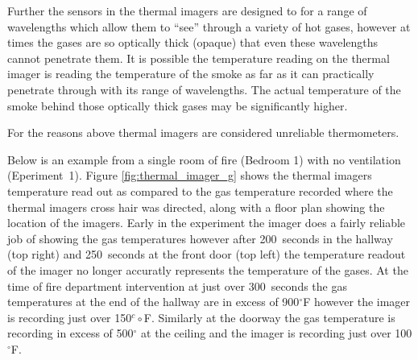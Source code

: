 \documentclass[12pt,oneside]{book}
\begin{document}
Further the sensors in the thermal imagers are designed to for a range of wavelengths which allow them to ``see'' through a variety of hot gases, however at times the gases are so optically thick (opaque) that even these wavelengths cannot penetrate them. It is possible the temperature reading on the thermal imager is reading the temperature of the smoke as far as it can practically penetrate through with its range of wavelengths. The actual temperature of the smoke behind those optically thick gases may be significantly higher. 


For the reasons above thermal imagers are considered unreliable thermometers.

Below is an example from a single room of fire (Bedroom 1) with no ventilation (Eperiment~1). Figure \ref{fig:thermal_imager_g} shows the thermal imagers temperature read out as compared to the gas temperature recorded where the thermal imagers cross hair was directed, along with a floor plan showing the location of the imagers. Early in the experiment the imager does a fairly reliable job of showing the gas temperatures however after 200~seconds in the hallway (top right) and 250~seconds at the front door (top left) the temperature readout of the imager no longer accuratly represents the temperature of the gases. At the time of fire department intervention at just over 300~seconds the gas temperatures at the end of the hallway are in excess of 900$^\circ$F however the imager is recording just over 150$^c\circ$F. Similarly at the doorway the gas temperature is recording in excess of 500$^\circ$ at the ceiling and the imager is recording just over 100$^\circ$F. 


\end{document}
